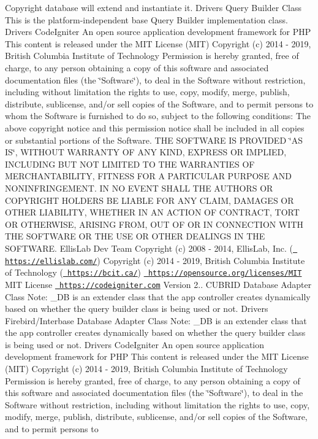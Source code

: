 \begin{DoxyCopyright}{Copyright}
database will extend and instantiate it.  Drivers Query Builder Class This is the platform-\/independent base Query Builder implementation class.  Drivers Code\+Igniter An open source application development framework for P\+HP This content is released under the M\+IT License (M\+IT) Copyright (c) 2014 -\/ 2019, British Columbia Institute of Technology Permission is hereby granted, free of charge, to any person obtaining a copy of this software and associated documentation files (the \char`\"{}\+Software\char`\"{}), to deal in the Software without restriction, including without limitation the rights to use, copy, modify, merge, publish, distribute, sublicense, and/or sell copies of the Software, and to permit persons to whom the Software is furnished to do so, subject to the following conditions\+: The above copyright notice and this permission notice shall be included in all copies or substantial portions of the Software. T\+HE S\+O\+F\+T\+W\+A\+RE IS P\+R\+O\+V\+I\+D\+ED \char`\"{}\+A\+S I\+S\char`\"{}, W\+I\+T\+H\+O\+UT W\+A\+R\+R\+A\+N\+TY OF A\+NY K\+I\+ND, E\+X\+P\+R\+E\+SS OR I\+M\+P\+L\+I\+ED, I\+N\+C\+L\+U\+D\+I\+NG B\+UT N\+OT L\+I\+M\+I\+T\+ED TO T\+HE W\+A\+R\+R\+A\+N\+T\+I\+ES OF M\+E\+R\+C\+H\+A\+N\+T\+A\+B\+I\+L\+I\+TY, F\+I\+T\+N\+E\+SS F\+OR A P\+A\+R\+T\+I\+C\+U\+L\+AR P\+U\+R\+P\+O\+SE A\+ND N\+O\+N\+I\+N\+F\+R\+I\+N\+G\+E\+M\+E\+NT. IN NO E\+V\+E\+NT S\+H\+A\+LL T\+HE A\+U\+T\+H\+O\+RS OR C\+O\+P\+Y\+R\+I\+G\+HT H\+O\+L\+D\+E\+RS BE L\+I\+A\+B\+LE F\+OR A\+NY C\+L\+A\+IM, D\+A\+M\+A\+G\+ES OR O\+T\+H\+ER L\+I\+A\+B\+I\+L\+I\+TY, W\+H\+E\+T\+H\+ER IN AN A\+C\+T\+I\+ON OF C\+O\+N\+T\+R\+A\+CT, T\+O\+RT OR O\+T\+H\+E\+R\+W\+I\+SE, A\+R\+I\+S\+I\+NG F\+R\+OM, O\+UT OF OR IN C\+O\+N\+N\+E\+C\+T\+I\+ON W\+I\+TH T\+HE S\+O\+F\+T\+W\+A\+RE OR T\+HE U\+SE OR O\+T\+H\+ER D\+E\+A\+L\+I\+N\+GS IN T\+HE S\+O\+F\+T\+W\+A\+RE.  Ellis\+Lab Dev Team  Copyright (c) 2008 -\/ 2014, Ellis\+Lab, Inc. (\href{https://ellislab.com/}{\texttt{ https\+://ellislab.\+com/}})  Copyright (c) 2014 -\/ 2019, British Columbia Institute of Technology (\href{https://bcit.ca/}{\texttt{ https\+://bcit.\+ca/}})  \href{https://opensource.org/licenses/MIT}{\texttt{ https\+://opensource.\+org/licenses/\+M\+IT}} M\+IT License  \href{https://codeigniter.com}{\texttt{ https\+://codeigniter.\+com}}  Version 2..  C\+U\+B\+R\+ID Database Adapter Class Note\+: \+\_\+\+DB is an extender class that the app controller creates dynamically based on whether the query builder class is being used or not.  Drivers Firebird/\+Interbase Database Adapter Class Note\+: \+\_\+\+DB is an extender class that the app controller creates dynamically based on whether the query builder class is being used or not.  Drivers Code\+Igniter An open source application development framework for P\+HP This content is released under the M\+IT License (M\+IT) Copyright (c) 2014 -\/ 2019, British Columbia Institute of Technology Permission is hereby granted, free of charge, to any person obtaining a copy of this software and associated documentation files (the \char`\"{}\+Software\char`\"{}), to deal in the Software without restriction, including without limitation the rights to use, copy, modify, merge, publish, distribute, sublicense, and/or sell copies of the Software, and to permit persons to 
\end{DoxyCopyright}
